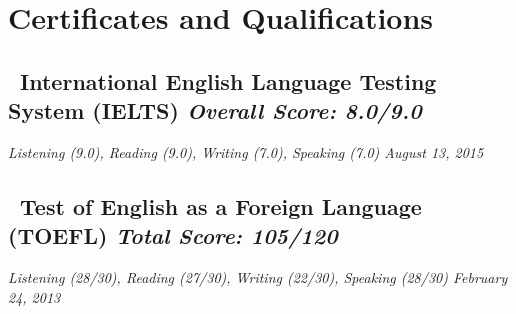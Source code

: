 \section*{Certificates and Qualifications}

\subsection*{{\color{special-color}\faCertificate \ International English Language Testing System (IELTS) \hfill \textnormal{\emph{Overall Score: 8.0/9.0}}}}
\begin{description}
  \item \emph{Listening (9.0), Reading (9.0), Writing (7.0), Speaking (7.0) \hfill {\color{gray}August 13, 2015}}
\end{description}

\subsection*{{\color{special-color}\faCertificate \ Test of English as a Foreign Language (TOEFL) \hfill \textnormal{\emph{Total Score: 105/120}}}}
\begin{description}
  \item \emph{Listening (28/30), Reading (27/30), Writing (22/30), Speaking (28/30) \hfill {\color{gray}February 24, 2013}}
\end{description}

